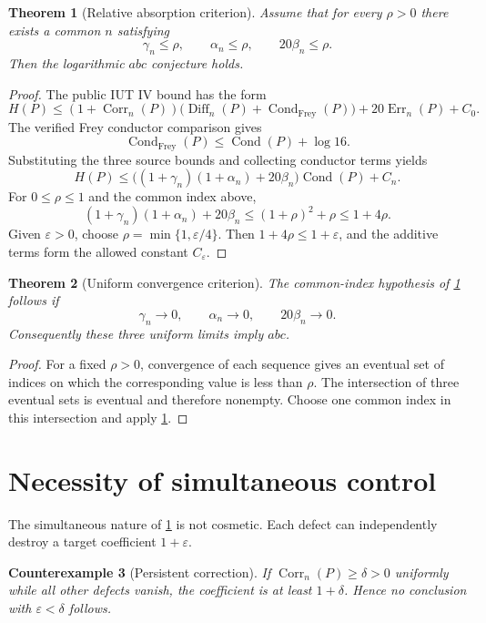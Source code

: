 \documentclass[11pt]{amsart}
\newtheorem{theorem}{Theorem}[section]
\newtheorem{counterexample}[theorem]{Counterexample}
\theoremstyle{definition}
\theoremstyle{remark}
\newcommand{\eps}{\varepsilon}
\newcommand{\Corr}{\operatorname{Corr}}
\newcommand{\Diff}{\operatorname{Diff}}
\newcommand{\Err}{\operatorname{Err}}
\newcommand{\Cond}{\operatorname{Cond}}
\begin{document}
\begin{theorem}[Relative absorption criterion]\label{thm:relative-absorption}
Assume that for every $\rho>0$ there exists a common $n$ satisfying
\[
 \gamma_n\le\rho,
 \qquad
 \alpha_n\le\rho,
 \qquad
 20\beta_n\le\rho.
\]
Then the logarithmic $abc$ conjecture holds.
\end{theorem}

\begin{proof}
The public IUT IV bound has the form
\[
 H(P)\le
 (1+\Corr_n(P))
 \bigl(\Diff_n(P)+\Cond_{\mathrm{Frey}}(P)\bigr)
 +20\Err_n(P)+C_0.
\]
The verified Frey conductor comparison gives
\[
 \Cond_{\mathrm{Frey}}(P)
 \le\Cond(P)+\log16.
\]
Substituting the three source bounds and collecting conductor terms yields
\[
 H(P)\le
 \bigl((1+\gamma_n)(1+\alpha_n)+20\beta_n\bigr)\Cond(P)
 +C_n.
\]
For $0\le\rho\le1$ and the common index above,
\[
 (1+\gamma_n)(1+\alpha_n)+20\beta_n
 \le (1+\rho)^2+\rho
 \le1+4\rho.
\]
Given $\eps>0$, choose $\rho=\min\{1,\eps/4\}$.  Then
$1+4\rho\le1+\eps$, and the additive terms form the allowed constant
$C_{\eps}$.
\end{proof}

\begin{theorem}[Uniform convergence criterion]\label{thm:uniform-convergence}
The common-index hypothesis of \cref{thm:relative-absorption} follows if
\[
 \gamma_n\to0,
 \qquad
 \alpha_n\to0,
 \qquad
 20\beta_n\to0.
\]
Consequently these three uniform limits imply $abc$.
\end{theorem}

\begin{proof}
For a fixed $\rho>0$, convergence of each sequence gives an eventual set of
indices on which the corresponding value is less than $\rho$.  The
intersection of three eventual sets is eventual and therefore nonempty.
Choose one common index in this intersection and apply
\cref{thm:relative-absorption}.
\end{proof}

\section{Necessity of simultaneous control}

The simultaneous nature of \cref{thm:relative-absorption} is not cosmetic.
Each defect can independently destroy a target coefficient $1+\eps$.

\begin{counterexample}[Persistent correction]
If $\Corr_n(P)\ge\delta>0$ uniformly while all other defects vanish, the
coefficient is at least $1+\delta$.  Hence no conclusion with
$\eps<\delta$ follows.
\end{counterexample}
\end{document}
